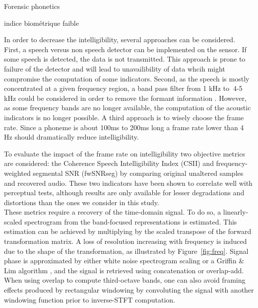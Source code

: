 \documentclass[final,3p,times,twocolumn]{elsarticle}
\begin{document}
Forensic phonetics \cite{baldwin1990forensic}

indice biométrique faible \cite{boe2000forensic}

In order to decrease the intelligibility, several approaches can be considered. First,  a speech versus non speech detector can be implemented on the sensor. If some speech is detected, the data is not transmitted. This approach is prone to failure of the detector and will lead to unavailibility of data whcih might compromise the computation of some indicators. Second, as the speech is mostly concentrated at a given frequency region, a band pass filter from 1 kHz to $~$4-5 kHz could be considered in order to remove the formant information \cite{kent1992acoustic}. However, as some frequency bands are no longer available, the computation of the acoustic indicators is no longer possible. A third approach is to wisely choose the frame rate. Since a phoneme is about 100ms to 200ms long \cite{kuwabara1996acoustic} \cite{rosen1992temporal} a frame rate lower than 4 Hz should dramatically reduce intelligibility.





To evaluate the impact of the frame rate on intelligibility two objective metrics are considered: the Coherence Speech Intelligibility Index\cite{kates2005} (CSII) and frequency-weighted segmental SNR\cite{hu2008} (fwSNRseg) by comparing original unaltered samples and recovered audio. These two indicators have been shown to correlate well with perceptual tests\cite{ma2009}, although results are only available for lesser degradations and distortions than the ones we consider in this study.\\

These metrics require a recovery of the time-domain signal. To do so, a linearly-scaled spectrogram from the band-focused representations is estimated. This estimation can be achieved by multiplying by the scaled transpose of the forward transformation matrix. A loss of resolution increasing with frequency is induced due to the shape of the transformation, as illustrated by Figure~\ref{fig:freq}. Signal phase is approximated by either white noise spectrogram scaling or a Griffin \& Lim algorithm \cite{griffin1984}, and the signal is retrieved using concatenation or overlap-add. When using overlap to compute third-octave bands, one can also avoid framing effects produced by rectangular windowing by convoluting the signal with another windowing function prior to inverse-STFT computation.\\
\end{document}
